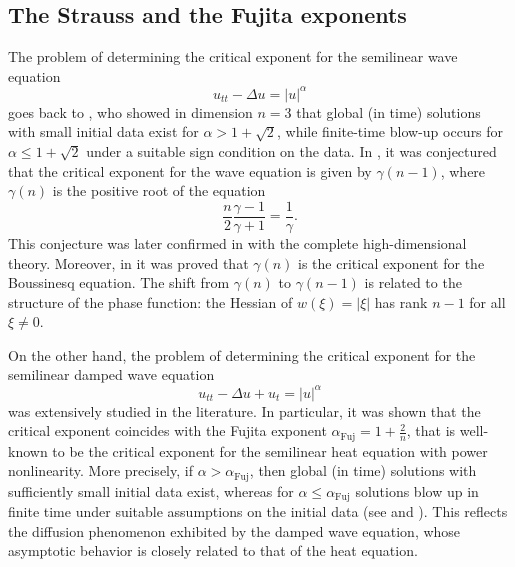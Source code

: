 \documentclass[10pt]{article}
\newcommand{\<}{\langle}
\renewcommand{\>}{\rangle}
\numberwithin{equation}{section}
\begin{document}
\subsection*{The Strauss and the Fujita exponents}
The problem of determining the critical exponent for the semilinear wave equation
\[ u_{tt}-\Delta u = |u|^\alpha \]
goes back to \cite{John=1979}, who showed in dimension $n=3$ that global (in time) solutions with small initial data exist for $\alpha>1+\sqrt{2}$, while finite-time blow-up occurs for $\alpha\leq 1+\sqrt{2}$ under a suitable sign condition on the data. In \cite{Strauss=1981}, it was conjectured that the critical exponent for the wave equation is given by $\gamma(n-1)$, where $\gamma(n)$ is the positive root of the equation
\[ \frac{n}{2}\frac{\gamma-1}{\gamma+1}=\frac{1}{\gamma}. \]
This conjecture was later confirmed in \cite{GLS=1997} with the complete high-dimensional theory. Moreover, in \cite{Cho-Ozawa=2007} it was proved that $\gamma(n)$ is the critical exponent for the Boussinesq equation.  The shift from $\gamma(n)$ to $\gamma(n-1)$ is related to the structure of the phase function: the Hessian of $w(\xi)=|\xi|$ has rank $n-1$ for all $\xi\neq0$.

 On the other hand, the problem of determining the critical exponent for the semilinear damped wave equation
\[ u_{tt}-\Delta u + u_t = |u|^\alpha \]
was extensively studied in the literature. In particular, it was shown that the critical exponent coincides with the Fujita exponent $\alpha_{\text{Fuj}}=1+\frac{2}{n}$, that is well-known to be the critical exponent for the semilinear heat equation with power nonlinearity. More precisely, if $\alpha>\alpha_{\text{Fuj}}$, then global (in time) solutions with sufficiently small initial data exist, whereas for $\alpha\leq \alpha_{\text{Fuj}}$ solutions blow up in finite time under suitable assumptions on the initial data (see \cite{Todorova-Yordanov=2001} and \cite{Zhang=2001}). This reflects the diffusion phenomenon exhibited by the damped wave equation, whose asymptotic behavior is closely related to that of the heat equation.
\end{document}
